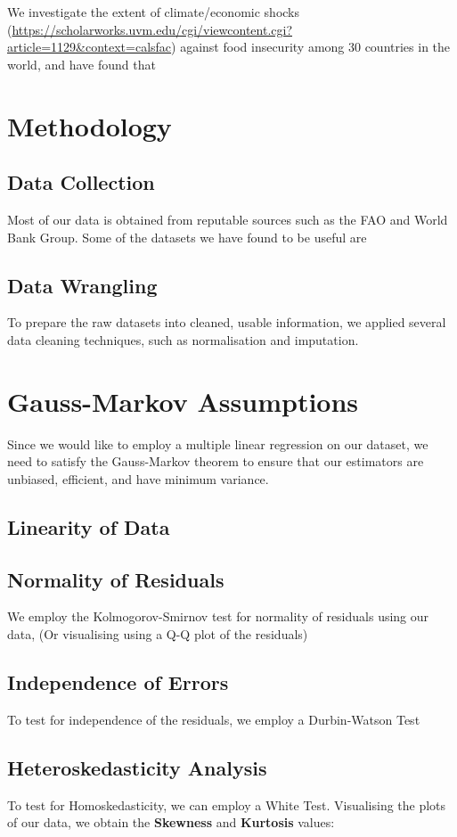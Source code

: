 \documentclass{article}
\begin{document}
\noindent We investigate the extent of climate/economic shocks (\url{https://scholarworks.uvm.edu/cgi/viewcontent.cgi?article=1129&context=calsfac}) against food insecurity among 30 countries in the world, and have found that 

\section{Methodology}

\subsection{Data Collection}
Most of our data is obtained from reputable sources such as the FAO and World Bank Group. Some of the datasets we have found to be useful are 

\subsection{Data Wrangling}
To prepare the raw datasets into cleaned, usable information, we applied several data cleaning techniques, such as normalisation and imputation.

\section{Gauss-Markov Assumptions}
Since we would like to employ a multiple linear regression on our dataset, we need to satisfy the Gauss-Markov theorem to ensure that our estimators are unbiased, efficient, and have minimum variance.

\subsection{Linearity of Data}

\subsection{Normality of Residuals}
We employ the Kolmogorov-Smirnov test for normality of residuals using our data, (Or visualising using a Q-Q plot of the residuals)  

\subsection{Independence of Errors}
To test for independence of the residuals, we employ a Durbin-Watson Test 

\subsection{Heteroskedasticity Analysis}
To test for Homoskedasticity, we can employ a White Test. Visualising the plots of our data, we obtain the \textbf{Skewness} and \textbf{Kurtosis} values: 
\end{document}
